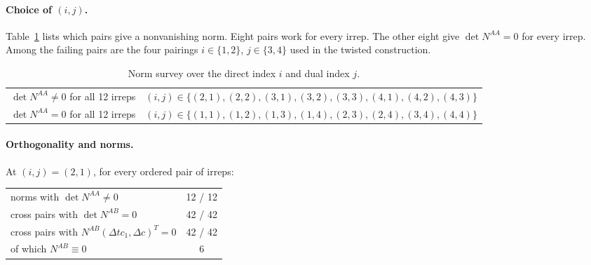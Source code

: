 \documentclass[11pt]{article}
\begin{document}
\paragraph{Choice of $(i,j)$.} Table~\ref{tab:survey} lists which pairs give a nonvanishing norm.
Eight pairs work for every irrep. The other eight give $\det N^{AA}=0$ for every irrep. Among the
failing pairs are the four pairings $i\in\{1,2\}$, $j\in\{3,4\}$ used in the twisted construction.

\begin{table}[h]
\centering
\begin{tabular}{ll}
\toprule
$\det N^{AA}\neq0$ for all 12 irreps & $(i,j)\in\{(2,1),(2,2),(3,1),(3,2),(3,3),(4,1),(4,2),(4,3)\}$\\
$\det N^{AA}=0$ for all 12 irreps & $(i,j)\in\{(1,1),(1,2),(1,3),(1,4),(2,3),(2,4),(3,4),(4,4)\}$\\
\bottomrule
\end{tabular}
\caption{Norm survey over the direct index $i$ and dual index $j$.}
\label{tab:survey}
\end{table}

\paragraph{Orthogonality and norms.} At $(i,j)=(2,1)$, for every ordered pair of irreps:

\begin{center}
\begin{tabular}{lc}
\toprule
norms with $\det N^{AA}\neq0$ & 12 / 12\\
cross pairs with $\det N^{AB}=0$ & 42 / 42\\
cross pairs with $N^{AB}(\Delta tc_1,\Delta c)^T=0$ & 42 / 42\\
\quad of which $N^{AB}\equiv0$ & 6\\
\bottomrule
\end{tabular}
\end{center}
\end{document}
